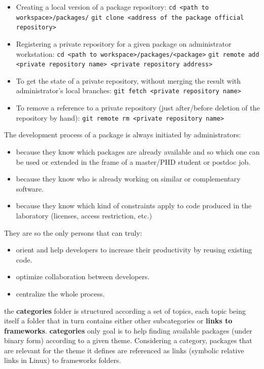 \documentclass[12pt,a4paper]{article}
\begin{document}
\begin{itemize}
\item Creating a local version of a package repository:
\linebreak \texttt{cd <path to workspace>/packages/}
\linebreak \texttt{git clone <address of the package official repository>}
\item Registering a private repository for a given package on administrator workstation:
\linebreak \texttt{cd <path to workspace>/packages/<package>}
\linebreak \texttt{git remote add <private repository name> <private repository address>}
\item To get the state of a private repository, without merging the result with administrator's local branches:
\linebreak \texttt{git fetch <private repository name>}
\item To remove a reference to a private repository (just after/before deletion of the repository by hand):
\linebreak \texttt{git remote rm <private repository name>}
\end{itemize} 

 
The development process of a package is always initiated by administrators:
\begin{itemize}
\item because they know which packages are already available and so which one can be used or extended in the frame of a master/PHD student or postdoc job.
\item because they know who is already working on similar or complementary software.
\item because they know which kind of constraints apply to code produced in the laboratory (licenses, access restriction, etc.)
\end{itemize} 
They are so the only persons that can truly:
\begin{itemize}
\item orient and help developers to increase their productivity by reusing existing code.
\item optimize collaboration between developers.
\item centralize the whole process.
\end{itemize} 

the \textbf{categories} folder is structured according a set of topics, each topic being itself a folder that in turn contains either other subcategories or \textbf{links to frameworks}. \textbf{categories} only goal is to help finding available packages (under binary form) according to a given theme. Considering a category, packages that are relevant for the theme it defines are referenced as links (symbolic relative links in Linux) to frameworks folders.
\end{document}
